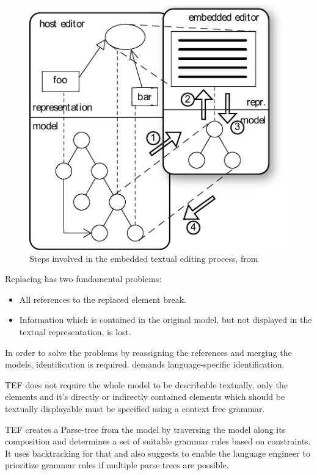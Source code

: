 \begin{figure}
\centering
\includegraphics[scale=1.2]{gfx/ex/tef} 
\caption{Steps involved in the embedded textual editing process, from \cite{TefPaper}}
\label{pic:tef}
\end{figure}

Replacing has two fundamental problems:
\begin{itemize}
	\item All references to the replaced element break.
	\item Information which is contained in the original model, but not displayed in the textual representation, is lost.
\end{itemize}
In order to solve the problems by reassigning the references and merging the models, identification is required. \cite{TefPaper} demands language-specific identification. 

TEF does not require the whole model to be describable textually, only the elements and it's directly or indirectly contained elements which should be textually displayable must be specified using a context free grammar.

TEF creates a Parse-tree from the model by traversing the model along its composition and determines a set of suitable grammar rules based on constraints. It uses backtracking for that and \cite{TefPaper} also suggests to enable the language engineer to prioritize grammar rules if multiple parse trees are possible.